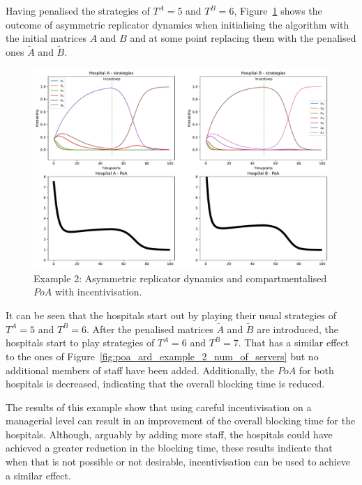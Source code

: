 Having penalised the strategies of \(T^A = 5\) and \(T^B = 6\),
Figure~\ref{fig:poa_ard_example_2_penalty} shows the outcome of asymmetric
replicator dynamics when initialising the algorithm with the initial matrices
\(A\) and \(B\) and at some point replacing them with the penalised ones
\(\tilde{A}\) and \(\tilde{B}\). 

\begin{figure}[H]
    \centering
    \includegraphics[width=\linewidth]{chapters/05_numerical_results/Bin/example_2/poa_ard_example_2_penalty.pdf}
    \caption{Example 2: Asymmetric replicator dynamics and compartmentalised
    \(PoA\) with incentivisation.}
    \label{fig:poa_ard_example_2_penalty}
\end{figure}

It can be seen that the hospitals start out by playing their usual strategies
of \(T^A = 5\) and \(T^B = 6\).
After the penalised matrices \(\tilde{A}\) and \(\tilde{B}\) are introduced,
the hospitals start to play strategies of \(T^A = 6\) and \(T^B = 7\).
That has a similar effect to the ones of
Figure~\ref{fig:poa_ard_example_2_num_of_servers} but no additional members of
staff have been added.
Additionally, the \(PoA\) for both hospitals is decreased, indicating that
the overall blocking time is reduced.

The results of this example show that using careful incentivisation on a
managerial level can result in an improvement of the overall blocking time
for the hospitals.
Although, arguably by adding more staff, the hospitals could have achieved
a greater reduction in the blocking time, these results indicate that when
that is not possible or not desirable, incentivisation can be used to
achieve a similar effect.

